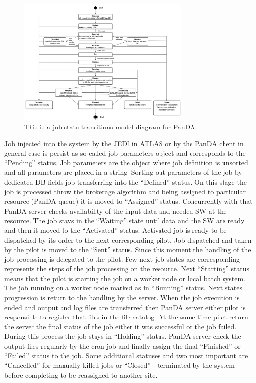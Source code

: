 \begin{figure}
  \includegraphics[width=0.75\textwidth]{images/job-state-diagram.png}
\caption{This is a job state transitions model diagram for PanDA.}
\label{fig:jobstates}
\end{figure}

Job injected into the system by the JEDI in ATLAS or by the PanDA client in
general case is persist as so-called job parameters object and corresponds to
the ``Pending'' status. Job parameters are the object where job definition is
unsorted and all parameters are placed in a string. Sorting out parameters of
the job by dedicated DB fields job transferring into the ``Defined'' status.
On this stage the job is processed throw the brokerage algorithm and being
assigned to particular resource (PanDA queue) it is moved to ``Assigned''
status. Concurrently with that PanDA server checks availability of the input
data and needed SW at the resource. The job stays in the ``Waiting'' state
until data and the SW are ready and then it moved to the ``Activated''
status. Activated job is ready to be dispatched by its order to the next
corresponding pilot. Job dispatched and taken by the pilot is moved to the
``Sent'' status. Since this moment the handling of the job processing is
delegated to the pilot. Few next job states are corresponding represents the
steps of the job processing on the resource. Next ``Starting'' status means
that the pilot is starting the job on a worker node or local batch system.
The job running on a worker node marked as in ``Running'' status. Next states
progression is return to the handling by the server. When the job execution
is ended and output and log files are transferred then PanDA server either
pilot is responsible to register that files in the file catalog. At the same
time pilot return the server the final status of the job either it was
successful or the job failed. During this process the job stays in
``Holding'' status. PanDA server check the output files regularly by the cron
job and finally assign the final ``Finished'' or ``Failed'' status to the
job. Some additional statuses and two most important are ``Cancelled'' for
manually killed jobs or ``Closed'' - terminated by the system before
completing to be reassigned to another site.

